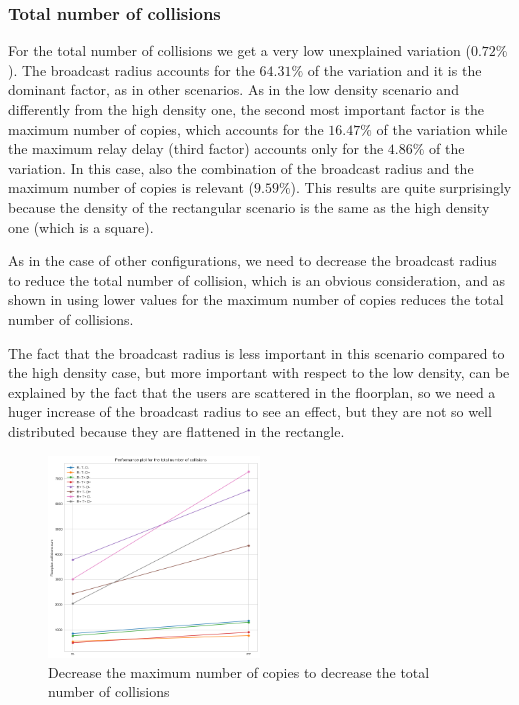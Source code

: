 \subsubsection{Total number of collisions}\label{subsubsec:rect2krcollisions}

For the total number of collisions we get a very low unexplained variation
(\(0.72\%\)). The broadcast radius accounts for the \(64.31\%\) of the variation
and it is the dominant factor, as in other scenarios. As in the low density
scenario and differently from the high density one, the second most important
factor is the maximum number of copies, which accounts for the \(16.47\%\) of
the variation while the maximum relay delay (third factor) accounts only for the
\(4.86\%\) of the variation. In this case, also the combination of the broadcast
radius and the maximum number of copies is relevant (\(9.59\%\)). This results
are quite surprisingly because the density of the rectangular scenario is the
same as the high density one (which is a square).

As in the case of other configurations, we need to decrease the broadcast radius
to reduce the total number of collision, which is an obvious consideration, and
as shown in  using lower values for the maximum
number of copies reduces the total number of collisions.

The fact that the broadcast radius is less important in this scenario compared
to the high density case, but more important with respect to the low density,
can be explained by the fact that the users are scattered in the floorplan, so
we need a huger increase of the broadcast radius to see an effect, but they are
not so well distributed because they are flattened in the rectangle.

\begin{figure}[hbt]
	\centering
	\includegraphics[width=0.5\textwidth]{img/rect/collisions_m_perfplot.png}
	\caption{Decrease the maximum number of copies to decrease the total
	number of collisions}\label{fig:rectperfcollisionsm}
\end{figure}
